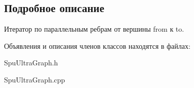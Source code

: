 \subsection{Подробное описание}
Итератор по параллельным ребрам от вершины from к to. 

Объявления и описания членов классов находятся в файлах\+:\begin{DoxyCompactItemize}
\item 
Spu\+Ultra\+Graph.\+h\item 
Spu\+Ultra\+Graph.\+cpp\end{DoxyCompactItemize}
